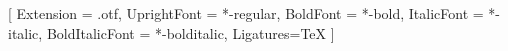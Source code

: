 \usepackage[hyphens]{url}


\makeatletter
\g@addto@macro{\UrlBreaks}{\UrlOrds}
\makeatother



\ifluatex
  \usepackage[no-math]{fontspec}
  \usepackage{unicode-math}

  \setmainfont{texgyretermes}[
    Extension = .otf,
    UprightFont = *-regular,
    BoldFont = *-bold,
    ItalicFont = *-italic,
    BoldItalicFont = *-bolditalic,
    Ligatures=TeX
  ]
  \setsansfont[Scale=.9]{TeX Gyre Heros}
  \setmonofont{Latin Modern Mono} %

  \usepackage{selnolig}

\else
  \RequirePackage{newtxtext}
  \RequirePackage{newtxmath}
  \RequirePackage[zerostyle=b,scaled=.9]{newtxtt}

